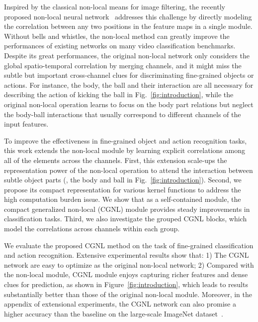 \documentclass{article}
\begin{document}
Inspired by the classical non-local means for image filtering, the recently proposed non-local neural network~\cite{non-local} addresses this challenge by directly modeling the correlation between any two positions in the feature maps in a single module.
Without bells and whistles, the non-local method can greatly improve the performances of existing networks on many video classification benchmarks.
Despite its great performances, the original non-local network only considers the global spatio-temporal correlation by merging channels, and it might miss the subtle but important cross-channel clues for discriminating fine-grained objects or actions.
For instance, the body, the ball and their interaction are all necessary for describing the action of kicking the ball in Fig.~\ref{fig:introduction}, while the original non-local operation learns to focus on the body part relations but neglect the body-ball interactions that usually correspond to different channels of the input features.

To improve the effectiveness in fine-grained object and action recognition tasks, this work extends the non-local module by learning explicit correlations among all of the elements across the channels.
First, this extension scale-ups the representation power of the non-local operation to attend the interaction between subtle object parts (\eg, the body and ball in Fig.~\ref{fig:introduction}).
Second, we propose its compact representation for various kernel functions to address the high computation burden issue.
We show that as a self-contained module, the compact generalized non-local (CGNL) module provides steady improvements in classification tasks.
Third, we also investigate the grouped CGNL blocks, which model the correlations across channels within each group.

We evaluate the proposed CGNL method on the task of fine-grained classification and action recognition.
Extensive experimental results show that:
1) The CGNL network are easy to optimize as the original non-local network;
2) Compared with the non-local module, CGNL module enjoys capturing richer features and dense clues for prediction, as shown in Figure~\ref{fig:introduction}, which leads to results substantially better than those of the original non-local module.
Moreover, in the appendix of extensional experiments, the CGNL network can also promise a higher accuracy than the baseline on the large-scale ImageNet dataset~\cite{imagenet}.
\end{document}
